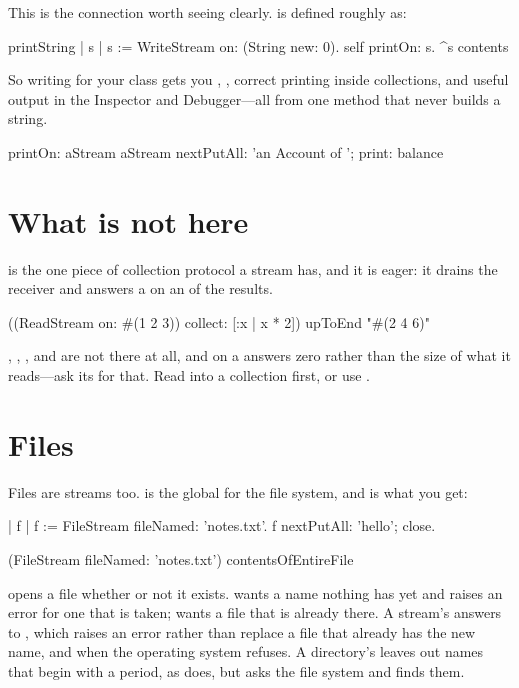 This is the connection worth seeing clearly.  is defined
roughly as:

\begin{st}
printString
    | s |
    s := WriteStream on: (String new: 0).
    self printOn: s.
    ^s contents
\end{st}

So writing  for your class gets you ,
, correct printing inside collections, and useful output in
the Inspector and Debugger---all from one method that never builds a string.

\begin{st}
printOn: aStream
    aStream nextPutAll: 'an Account of '; print: balance
\end{st}

\section{What is not here}

 is the one piece of collection protocol a stream has, and it
is eager: it drains the receiver and answers a  on an
 of the results.

\begin{st}
((ReadStream on: #(1 2 3)) collect: [:x | x * 2]) upToEnd   "#(2 4 6)"
\end{st}

, , ,  and
 are not there at all, and  on a 
answers zero rather than the size of what it reads---ask its 
for that. Read into a collection first, or use .

\section{Files}

Files are streams too.  is the global for the file system, and
 is what you get:

\begin{st}
| f |
f := FileStream fileNamed: 'notes.txt'.
f nextPutAll: 'hello'; close.

(FileStream fileNamed: 'notes.txt') contentsOfEntireFile
\end{st}

 opens a file whether or not it exists. 
wants a name nothing has yet and raises an error for one that is taken;
 wants a file that is already there. A stream's
 answers to , which raises an error rather than replace
a file that already has the new name, and when the operating system refuses. A
directory's  leaves out names that begin with a period, as
 does, but  asks the file system and finds them.

